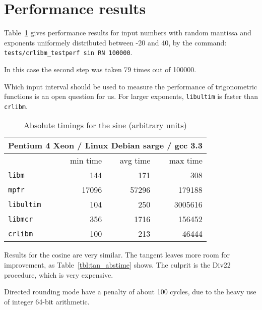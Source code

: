 \section{Performance results}

Table~\ref{tbl:sine_abstime} gives performance results for input numbers with random
mantissa and exponents uniformely distributed between -20 and 40, by the command:\\
\verb!tests/crlibm_testperf sin RN 100000!.

In this case the second step was taken 79 times out of 100000.

Which input interval should be used to measure the performance of
trigonometric functions is an open question for us. For larger exponents, \texttt{libultim}
is faster than \texttt{crlibm}.

\begin{table}[!htb]
\begin{center}
\renewcommand{\arraystretch}{1.2}
\begin{tabular}{|l|r|r|r|}
\hline
 \multicolumn{4}{|c|}{Pentium 4 Xeon / Linux Debian sarge / gcc 3.3}   \\ 
 \hline
                        & min time       & avg time     & max time        \\ 
 \hline
 \texttt{libm}          & 144           &        171    & 308      \\ 
 \hline
 \texttt{mpfr}          & 17096         &      57296    & 179188      \\ 
 \hline
 \texttt{libultim}      & 104           &        250    & 3005616      \\ 
 \hline
 \texttt{libmcr}        & 356           &       1716    & 156452      \\ 
 \hline
\texttt{crlibm}         & 100           &        213    & 46444      \\ 
 \hline
\end{tabular}
\end{center}
\caption{Absolute timings for the sine (arbitrary units)
  \label{tbl:sine_abstime}}
\end{table}

Results for the cosine are very similar. The tangent leaves more room
for improvement, as Table~\ref{tbl:tan_abstime} shows. The culprit is
the Div22 procedure, which is very expensive. 

Directed rounding mode have a penalty of about 100 cycles, due to the
heavy use of integer 64-bit arithmetic.

